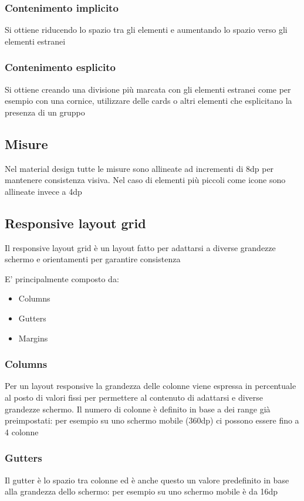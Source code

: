 \documentclass[12pt, a4paper]{report}
\begin{document}
			\subsubsection{Contenimento implicito}
			Si ottiene riducendo lo spazio tra gli elementi e aumentando lo spazio verso gli elementi estranei
			\subsubsection{Contenimento esplicito}
			Si ottiene creando una divisione più marcata con gli elementi estranei come per esempio con una cornice, utilizzare delle cards o altri elementi che esplicitano la presenza di un gruppo
			\cite{layout_organizzazione}
	\subsection{Misure}
		  Nel material design tutte le misure sono allineate ad incrementi di 8dp per mantenere consistenza visiva. Nel caso di elementi più piccoli come icone sono allineate invece a 4dp \cite{layout_misure}
	\subsection{Responsive layout grid}
		  Il responsive layout grid è un layout fatto per adattarsi a diverse grandezze schermo e orientamenti per garantire consistenza \cite{layout_grid}

		  E' principalmente composto da:
		  \begin{itemize}
			  \item Columns
			  \item Gutters
			  \item Margins
		  \end{itemize}
		\subsubsection{Columns}
		  Per un layout responsive la grandezza delle colonne viene espressa in percentuale al posto di valori fissi per permettere al contenuto di adattarsi e diverse grandezze schermo.
		  Il numero di colonne è definito in base a dei range già preimpostati: per esempio su uno schermo mobile (360dp) ci possono essere fino a 4 colonne
		\subsubsection{Gutters}
		  Il gutter è lo spazio tra colonne ed è anche questo un valore predefinito in base alla grandezza dello schermo: per esempio su uno schermo mobile è da 16dp 
\end{document}
